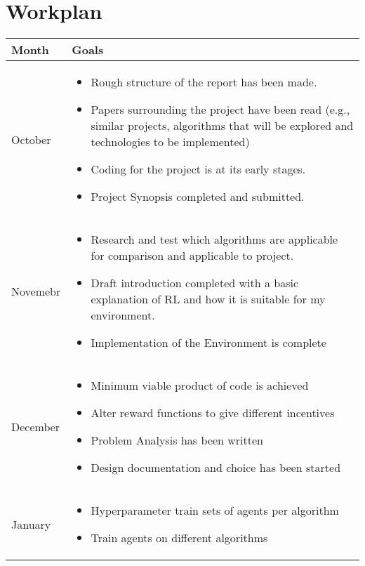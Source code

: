 \documentclass{surrey_disso_style}
\begin{document}
\section{Workplan}

\renewcommand{\arraystretch}{1.5}
\setlength{\tabcolsep}{8pt}

\begin{center}
\begin{tabular}{|p{1.6cm}|p{13cm}|}
   \hline
   \textbf{Month} & \textbf{Goals}\\
   \hline
   October & \begin{itemize}
      \item Rough structure of the report has been made. 
      \item Papers surrounding the project have been read (e.g., similar projects, algorithms that will be explored and technologies to be implemented)
      \item Coding for the project is at its early stages.
      \item Project Synopsis completed and submitted.
   \end{itemize} \\
   \hline
   Novemebr & 
      \begin{itemize}
      \item Research and test which algorithms are applicable for comparison and applicable to project.
      \item Draft introduction completed with a basic explanation of RL and how it is suitable for my environment.
      \item Implementation of the Environment is complete
      \end{itemize}\\
   \hline
   December & \begin{itemize}
      \item Minimum viable product of code is achieved
      \item Alter reward functions to give different incentives
      \item Problem Analysis has been written
      \item Design documentation and choice has been started
   \end{itemize}\\
   \hline
   January & \begin{itemize}
      \item Hyperparameter train sets of agents per algorithm
      \item Train agents on different algorithms 

\end{itemize}
\end{tabular}
\end{center}
\end{document}
